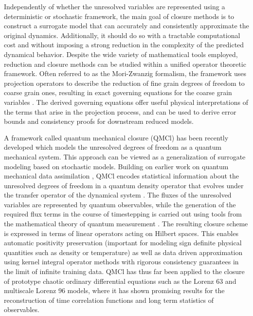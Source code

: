 \documentclass[letterpaper,10pt,3p,preprint]{elsarticle}
\begin{document}
Independently of whether the unresolved variables are represented
using a deterministic or stochastic framework, the main goal of
closure methods is to construct a surrogate model that can
accurately and consistently approximate the original dynamics.
Additionally, it should do so with a tractable computational
cost and without imposing a strong reduction in the complexity
of the predicted dynamical behavior.
Despite the wide variety of mathematical tools employed,
reduction and closure methods can be studied within a
unified operator theoretic framework.
Often referred to as the Mori-Zwanzig formalism,
the framework uses projection operators to describe
the reduction of fine grain degrees of freedom to coarse
grain ones, resulting in exact governing equations for
the coarse grain variables
\cite{Grabert1982,Chorin2000,Chorin2002,KLin2021}.
The derived governing equations offer useful physical
interpretations of the terms that arise in the projection
process, and can be used to derive error bounds and
consistency proofs for downstream reduced models.

A framework called quantum mechanical closure (QMCl)
\cite{Freeman2024}
has been recently developed which models the unresolved degrees
of freedom as a quantum mechanical system.
This approach can be viewed as a generalization of surrogate
modeling based on stochastic models.
Building on earlier work on quantum mechanical data assimilation
\cite{Giannakis2019pre,Freeman2023},
QMCl encodes statistical information about the unresolved degrees
of freedom in a quantum density operator
\cite{Hall2013,Sakurai2021,Takhtajan2008}
that evolves under the transfer operator of the dynamical system
\cite{Baladi2000}.
The fluxes of the unresolved variables are represented by quantum
observables, while the generation of the required flux terms in the
course of timestepping is carried out using tools from the mathematical
theory of quantum measurement
\cite{Hall2013,Sakurai2021,Takhtajan2008}.
The resulting closure scheme is expressed in terms of
linear operators acting on Hilbert spaces.
This enables automatic positivity preservation
(important for modeling sign definite physical quantities such
as density or temperature)
as well as data driven approximation using kernel integral
operator methods
\cite{Coifman2006,Berry2020,Giannakis2019acha}
with rigorous consistency guarantees in the limit of infinite
training data.
QMCl has thus far been applied to the closure of prototype chaotic
ordinary differential equations such as the Lorenz 63 and
multiscale Lorenz 96 models, where it has shown promising
results for the reconstruction of time correlation functions and
long term statistics of observables.
\end{document}
